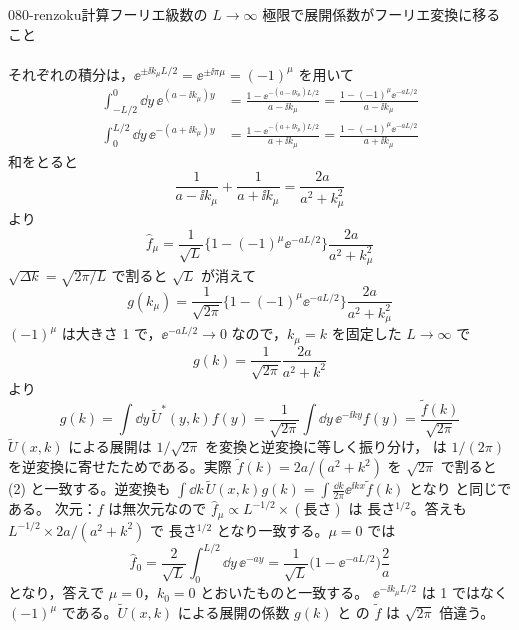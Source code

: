 \documentclass[uplatex,dvipdfmx,a4paper,11pt]{jsarticle}
\begin{document}
\begin{mondai}{080-renzoku}{計算}{フーリエ級数の $L\to\infty$ 極限で展開係数がフーリエ変換に移ること}
\begin{tadashii}
\begin{align*}
\end{align*}
それぞれの積分は，$\ee^{\pm\ii k_\mu L/2}=\ee^{\pm\ii\pi\mu}=(-1)^{\mu}$ を用いて
\begin{align*}
  \int_{-L/2}^{0}\dd y\,\ee^{(a-\ii k_\mu)y}&=\frac{1-\ee^{-(a-\ii k_\mu)L/2}}{a-\ii k_\mu}=\frac{1-(-1)^{\mu}\ee^{-aL/2}}{a-\ii k_\mu}\\
  \int_{0}^{L/2}\dd y\,\ee^{-(a+\ii k_\mu)y}&=\frac{1-\ee^{-(a+\ii k_\mu)L/2}}{a+\ii k_\mu}=\frac{1-(-1)^{\mu}\ee^{-aL/2}}{a+\ii k_\mu}
\end{align*}
和をとると
\[ \frac{1}{a-\ii k_\mu}+\frac{1}{a+\ii k_\mu}=\frac{2a}{a^{2}+k_\mu^{2}} \]
より
\[ \hat f_\mu=\frac{1}{\sqrt L}\bigl\{1-(-1)^{\mu}\ee^{-aL/2}\bigr\}\frac{2a}{a^{2}+k_\mu^{2}} \]
 $\sqrt{\Delta k}=\sqrt{2\pi/L}$ で割ると $\sqrt{L}$ が消えて
\[ g(k_\mu)=\frac{1}{\sqrt{2\pi}}\bigl\{1-(-1)^{\mu}\ee^{-aL/2}\bigr\}\frac{2a}{a^{2}+k_\mu^{2}} \]
$(-1)^{\mu}$ は大きさ 1 で，$\ee^{-aL/2}\to0$ なので，$k_\mu=k$ を固定した $L\to\infty$ で
\[ g(k)=\frac{1}{\sqrt{2\pi}}\frac{2a}{a^{2}+k^{2}} \]
  より
\[ g(k)=\int\dd y\,\tilde U^{*}(y,k)f(y)=\frac{1}{\sqrt{2\pi}}\int\dd y\,\ee^{-\ii ky}f(y)=\frac{\tilde f(k)}{\sqrt{2\pi}} \]
$\tilde U(x,k)$ による展開は $1/\sqrt{2\pi}$ を変換と逆変換に等しく振り分け， は $1/(2\pi)$ を逆変換に寄せたためである。実際 $\tilde f(k)=2a/(a^{2}+k^{2})$ を $\sqrt{2\pi}$ で割ると (2) と一致する。逆変換も $\int\dd k\,\tilde U(x,k)g(k)=\int\frac{\dd k}{2\pi}\ee^{\ii kx}\tilde f(k)$ となり  と同じである。
\kenzan 次元：$f$ は無次元なので $\hat f_\mu\propto L^{-1/2}\times(\text{長さ})$ は 長さ$^{1/2}$。答えも $L^{-1/2}\times 2a/(a^2+k^2)$ で 長さ$^{1/2}$ となり一致する。$\mu=0$ では
\[ \hat f_0=\frac{2}{\sqrt L}\int_0^{L/2}\dd y\,\ee^{-ay}=\frac{1}{\sqrt L}\bigl(1-\ee^{-aL/2}\bigr)\frac{2}{a} \]
となり，答えで $\mu=0$，$k_0=0$ とおいたものと一致する。
\tsumazuki $\ee^{-\ii k_\mu L/2}$ は 1 ではなく $(-1)^{\mu}$ である。$\tilde U(x,k)$ による展開の係数 $g(k)$ と  の $\tilde f$ は $\sqrt{2\pi}$ 倍違う。
\end{tadashii}
\end{mondai}
\end{document}
